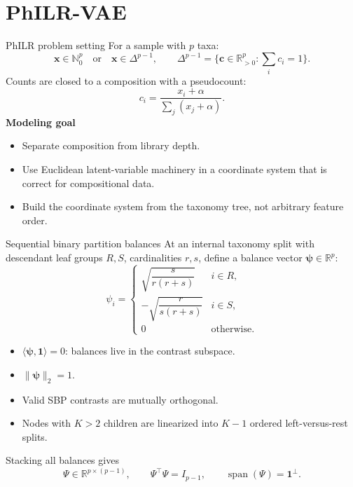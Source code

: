 \documentclass[aspectratio=169,10pt]{beamer}
\newcommand{\R}{\mathbb R}
\newcommand{\N}{\mathbb N}
\begin{document}
\section{PhILR-VAE}

\begin{frame}{PhILR problem setting}
\small
For a sample with \(p\) taxa:
\[
\bm x \in \N_0^p \quad\text{or}\quad \bm x \in \Delta^{p-1},
\qquad
\Delta^{p-1}=\{\bm c\in \R_{>0}^p:\sum_i c_i=1\}.
\]
Counts are closed to a composition with a pseudocount:
\[
c_i=\frac{x_i+\alpha}{\sum_j(x_j+\alpha)}.
\]
\textbf{Modeling goal}
\begin{itemize}
  \item Separate composition from library depth.
  \item Use Euclidean latent-variable machinery in a coordinate system that is correct for compositional data.
  \item Build the coordinate system from the taxonomy tree, not arbitrary feature order.
\end{itemize}
\end{frame}

\begin{frame}{Sequential binary partition balances}
\small
At an internal taxonomy split with descendant leaf groups \(R,S\), cardinalities \(r,s\), define a balance vector \(\bm\psi\in\R^p\):
\[
\psi_i =
\begin{cases}
\sqrt{\dfrac{s}{r(r+s)}} & i\in R,\\[3pt]
-\sqrt{\dfrac{r}{s(r+s)}} & i\in S,\\[3pt]
0 & \text{otherwise}.
\end{cases}
\]
\begin{itemize}
  \item \(\langle \bm\psi,\bm 1\rangle=0\): balances live in the contrast subspace.
  \item \(\|\bm\psi\|_2=1\).
  \item Valid SBP contrasts are mutually orthogonal.
  \item Nodes with \(K>2\) children are linearized into \(K-1\) ordered left-versus-rest splits.
\end{itemize}
Stacking all balances gives
\[
\Psi\in\R^{p\times(p-1)},\qquad \Psi^\top\Psi=I_{p-1},\qquad \operatorname{span}(\Psi)=\bm 1^\perp.
\]
\end{frame}
\end{document}

